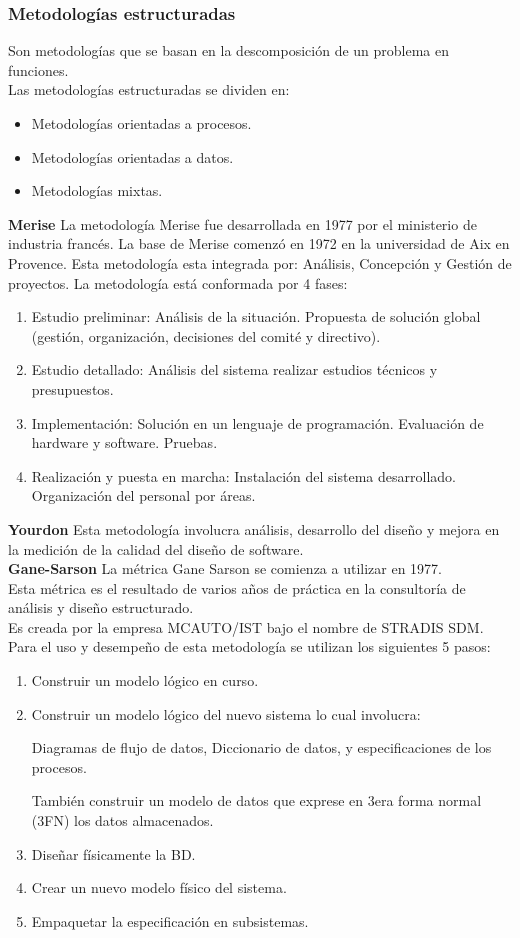 \documentclass[12pt,twoside]{article}
\begin{document}
\subsubsection{Metodologías estructuradas}
Son metodologías que se basan en la descomposición de un problema en funciones.\\
Las metodologías estructuradas se dividen en:
\begin{itemize}
    \item Metodologías orientadas a procesos.
    \item Metodologías orientadas a datos.
    \item Metodologías mixtas.
\end{itemize}
\textbf{Merise}
La metodología Merise fue desarrollada en 1977 por el ministerio de industria francés.
La base de Merise comenzó en 1972 en la universidad de Aix en Provence.
Esta metodología esta integrada por: Análisis, Concepción y Gestión de proyectos.
La metodología está conformada por 4 fases:
\begin{enumerate}
    \item Estudio preliminar: Análisis de la situación.
    Propuesta de solución global (gestión, organización, decisiones del comité y directivo).
    \item Estudio detallado: Análisis del sistema realizar estudios técnicos y presupuestos.
    \item Implementación: Solución en un lenguaje de programación.
    Evaluación de hardware y software.
    Pruebas.
    \item Realización y puesta en marcha: Instalación del sistema desarrollado.
    Organización del personal por áreas.
\end{enumerate}
\textbf{Yourdon}
Esta metodología involucra análisis, desarrollo del diseño y mejora en la medición de la calidad 
del diseño de software.\\
\textbf{Gane-Sarson}
La métrica Gane Sarson se comienza a utilizar en 1977.\\
Esta métrica es el resultado de varios años de práctica en la consultoría de análisis y diseño 
estructurado.\\
Es creada por la empresa MCAUTO/IST bajo el nombre de STRADIS SDM.\\
Para el uso y desempeño de esta metodología se utilizan los siguientes 5 pasos:
\begin{enumerate}
    \item Construir un modelo lógico en curso.
    \item Construir un modelo lógico del nuevo sistema lo cual involucra:
    
    Diagramas de flujo de datos, Diccionario de datos, y especificaciones de los procesos.

    También construir un modelo de datos que exprese en 3era forma normal (3FN) los datos
    almacenados.
    \item Diseñar físicamente la BD.
    \item Crear un nuevo modelo físico del sistema.
    \item Empaquetar la especificación en subsistemas. 
\end{enumerate}
\end{document}
